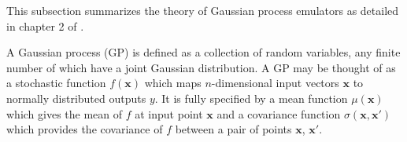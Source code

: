 \documentclass[aps,prc,reprint,superscriptaddress,amsmath]{revtex4-1}
\begin{document}
\newcommand{\x}{\mathbf x}
\newcommand{\y}{\mathbf y}
\newcommand{\zero}{\mathbf 0}
\newcommand{\muvec}{\boldsymbol\mu}
\newcommand{\N}{\mathcal N}

This subsection summarizes the theory of Gaussian process emulators as detailed in chapter 2 of \cite{Rasmussen:2006gp}.

A Gaussian process (GP) is defined as a collection of random variables, any finite number of which have a joint Gaussian distribution.
A GP may be thought of as a stochastic function $f(\x)$ which maps $n$-dimensional input vectors $\x$ to normally distributed outputs $y$.
It is fully specified by a mean function $\mu(\x)$ which gives the mean of $f$ at input point $\x$ and a covariance function $\sigma(\x, \x')$ which provides the covariance of $f$ between a pair of points $\x$, $\x'$.
\end{document}

